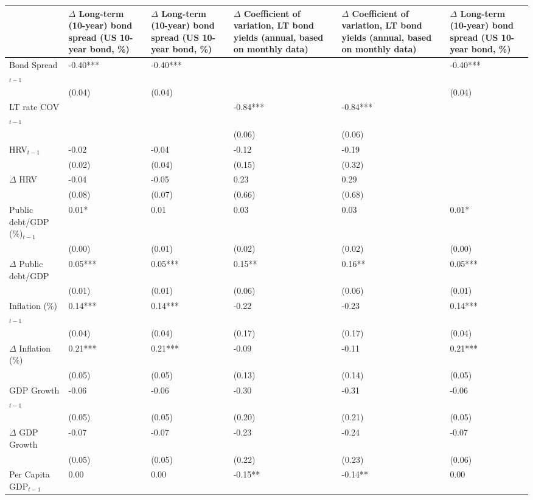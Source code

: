 \begingroup\tiny
\begin{tabular}{lp{3cm}p{3cm}p{3cm}p{3cm}p{3cm}}
  \hline
 & $\Delta$ Long-term (10-year) bond spread (US 10-year bond, \%) & $\Delta$ Long-term (10-year) bond spread (US 10-year bond, \%) & $\Delta$ Coefficient of variation, LT bond yields (annual, based on monthly data) & $\Delta$ Coefficient of variation, LT bond yields (annual, based on monthly data) & $\Delta$ Long-term (10-year) bond spread (US 10-year bond, \%) \\ 
  \hline
Bond Spread$_{t-1}$ & -0.40*** & -0.40*** &  &  & -0.40*** \\ 
   & (0.04) & (0.04) &  &  & (0.04) \\ 
  LT rate COV$_{t-1}$ &  &  & -0.84*** & -0.84*** &  \\ 
   &  &  & (0.06) & (0.06) &  \\ 
  HRV$_{t-1}$ & -0.02 & -0.04 & -0.12 & -0.19 &  \\ 
   & (0.02) & (0.04) & (0.15) & (0.32) &  \\ 
  $\Delta$ HRV & -0.04 & -0.05 & 0.23 & 0.29 &  \\ 
   & (0.08) & (0.07) & (0.66) & (0.68) &  \\ 
  Public debt/GDP (\%)$_{t-1}$ & 0.01* & 0.01 & 0.03 & 0.03 & 0.01* \\ 
   & (0.00) & (0.01) & (0.02) & (0.02) & (0.00) \\ 
  $\Delta$ Public debt/GDP & 0.05*** & 0.05*** & 0.15** & 0.16** & 0.05*** \\ 
   & (0.01) & (0.01) & (0.06) & (0.06) & (0.01) \\ 
  Inflation (\%) $_{t-1}$ & 0.14*** & 0.14*** & -0.22 & -0.23 & 0.14*** \\ 
   & (0.04) & (0.04) & (0.17) & (0.17) & (0.04) \\ 
  $\Delta$ Inflation (\%) & 0.21*** & 0.21*** & -0.09 & -0.11 & 0.21*** \\ 
   & (0.05) & (0.05) & (0.13) & (0.14) & (0.05) \\ 
  GDP Growth$_{t-1}$ & -0.06 & -0.06 & -0.30 & -0.31 & -0.06 \\ 
   & (0.05) & (0.05) & (0.20) & (0.21) & (0.05) \\ 
  $\Delta$ GDP Growth & -0.07 & -0.07 & -0.23 & -0.24 & -0.07 \\ 
   & (0.05) & (0.05) & (0.22) & (0.23) & (0.06) \\ 
  Per Capita GDP$_{t-1}$ & 0.00 & 0.00 & -0.15** & -0.14** & 0.00 \\ 

\end{tabular}
